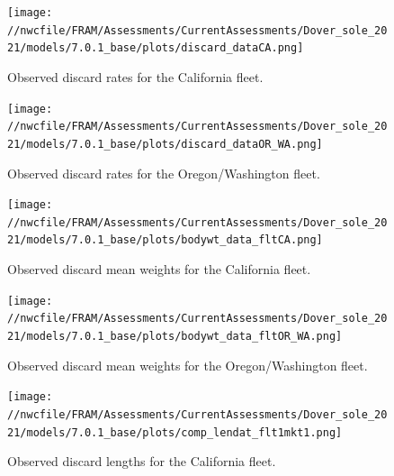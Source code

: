 \documentclass[11pt,
  english,
  a4paper,
]{article}
\begin{document}
\begin{figure}
\centering
\texttt{[image: //nwcfile/FRAM/Assessments/CurrentAssessments/Dover\_sole\_2021/models/7.0.1\_base/plots/discard\_dataCA.png]}
\caption{Observed discard rates for the California fleet.\label{fig:ca-disc-ob}}
\end{figure}

\tagmcend\tagstructend


\begin{figure}
\centering
\texttt{[image: //nwcfile/FRAM/Assessments/CurrentAssessments/Dover\_sole\_2021/models/7.0.1\_base/plots/discard\_dataOR\_WA.png]}
\caption{Observed discard rates for the Oregon/Washington fleet.\label{fig:orwa-disc-ob}}
\end{figure}

\tagmcend\tagstructend


\begin{figure}
\centering
\texttt{[image: //nwcfile/FRAM/Assessments/CurrentAssessments/Dover\_sole\_2021/models/7.0.1\_base/plots/bodywt\_data\_fltCA.png]}
\caption{Observed discard mean weights for the California fleet.\label{fig:ca-disc-wght-ob}}
\end{figure}

\tagmcend\tagstructend


\begin{figure}
\centering
\texttt{[image: //nwcfile/FRAM/Assessments/CurrentAssessments/Dover\_sole\_2021/models/7.0.1\_base/plots/bodywt\_data\_fltOR\_WA.png]}
\caption{Observed discard mean weights for the Oregon/Washington fleet.\label{fig:orwa-disc-wght-ob}}
\end{figure}

\tagmcend\tagstructend


\begin{figure}
\centering
\texttt{[image: //nwcfile/FRAM/Assessments/CurrentAssessments/Dover\_sole\_2021/models/7.0.1\_base/plots/comp\_lendat\_flt1mkt1.png]}
\caption{Observed discard lengths for the California fleet.\label{fig:ca-disc-len-ob}}
\end{figure}
\end{document}
